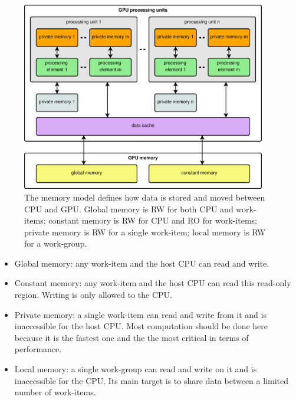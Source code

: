 \documentclass{article}
\begin{document}
\begin{figure}[!ht]
\centering
\includegraphics[width=0.95\textwidth]{memory.eps}
\caption{The memory model defines how data is stored and moved between CPU and GPU. Global memory is RW for both CPU and work-items; constant memory is RW for CPU and RO for work-items; private memory is RW for a single work-item; local memory is RW for a work-group.}
\label{figure:memory}
\end{figure}

\begin{itemize}
\item Global memory: any work-item and the host CPU can read and write.
\item Constant memory: any work-item and the host CPU can read this read-only region. Writing is only allowed to the CPU.
\item Private memory: a single work-item can read and write from it and is inaccessible for the host CPU. Most computation should be done here because it is the fastest one and the the most critical in terms of performance.
\item Local memory: a single work-group can read and write on it and is inaccessible for the CPU. Its main target is to share data between a limited number of work-items.
\end{itemize} 
\end{document}
